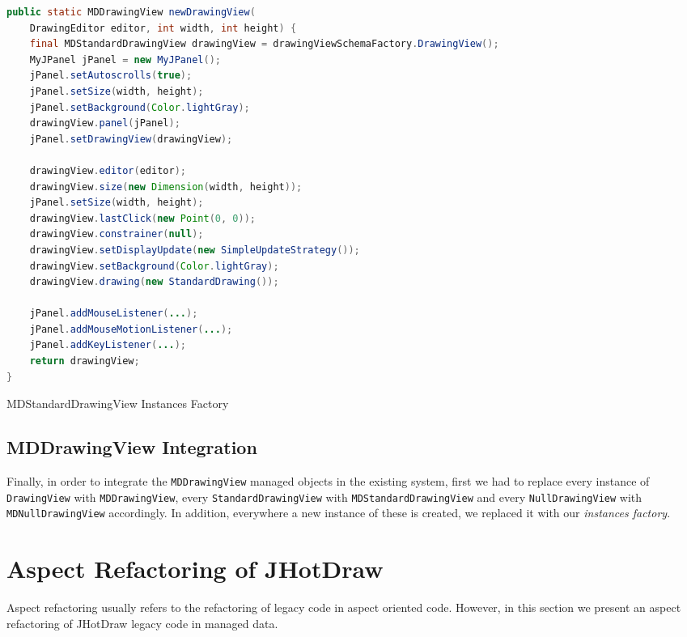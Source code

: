 \begin{sourcecode}[H]
	\begin{lstlisting}[language=Java, escapechar=|]
public static MDDrawingView newDrawingView(
	DrawingEditor editor, int width, int height) {
	final MDStandardDrawingView drawingView = drawingViewSchemaFactory.DrawingView();
	MyJPanel jPanel = new MyJPanel();
	jPanel.setAutoscrolls(true);
 	jPanel.setSize(width, height);
	jPanel.setBackground(Color.lightGray);
	drawingView.panel(jPanel);
	jPanel.setDrawingView(drawingView);

	drawingView.editor(editor);
	drawingView.size(new Dimension(width, height));
	jPanel.setSize(width, height);
	drawingView.lastClick(new Point(0, 0));
	drawingView.constrainer(null);
	drawingView.setDisplayUpdate(new SimpleUpdateStrategy());
	drawingView.setBackground(Color.lightGray);
	drawingView.drawing(new StandardDrawing());

	jPanel.addMouseListener(...);
	jPanel.addMouseMotionListener(...);
	jPanel.addKeyListener(...);
	return drawingView;
}
	\end{lstlisting}
	\label{lst:MDStandardDrawingView Instances Factory}
	\caption{MDStandardDrawingView Instances Factory}
\end{sourcecode}

\subsection{MDDrawingView Integration}
Finally, in order to integrate the \texttt{MDDrawingView} managed objects in the existing system, first we had to replace every instance of \texttt{DrawingView} with \texttt{MDDrawingView}, every \texttt{StandardDrawingView} with \texttt{MDStandardDrawingView} and every \texttt{NullDrawingView} with \texttt{MDNullDrawingView} accordingly.
In addition, everywhere a new instance of these is created, we replaced it with our \textit{instances factory}.

\section{Aspect Refactoring of JHotDraw}
Aspect refactoring usually refers to the refactoring of legacy code in aspect oriented code. 
However, in this section we present an aspect refactoring of JHotDraw legacy code in managed data.


